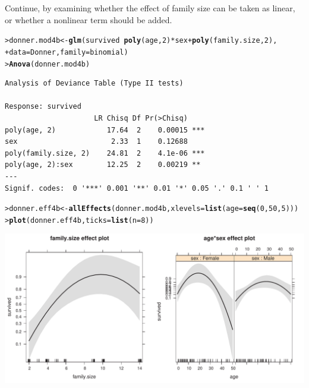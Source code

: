 \documentclass[10pt]{report}\usepackage[]{graphicx}\usepackage[]{color}
\makeatletter
\newcommand{\hlnum}[1]{\textcolor[rgb]{0.686,0.059,0.569}{#1}}%
\newcommand{\hlopt}[1]{\textcolor[rgb]{0,0,0}{#1}}%
\newcommand{\hlstd}[1]{\textcolor[rgb]{0.345,0.345,0.345}{#1}}%
\newcommand{\hlkwb}[1]{\textcolor[rgb]{0.69,0.353,0.396}{#1}}%
\newcommand{\hlkwc}[1]{\textcolor[rgb]{0.333,0.667,0.333}{#1}}%
\newcommand{\hlkwd}[1]{\textcolor[rgb]{0.737,0.353,0.396}{\textbf{#1}}}%
\newenvironment{kframe}{%
 \def\at@end@of@kframe{}%
 \ifinner\ifhmode%
  \def\at@end@of@kframe{\end{minipage}}%
  \begin{minipage}{\columnwidth}%
 \fi\fi%
 \def\FrameCommand##1{\hskip\@totalleftmargin \hskip-\fboxsep
 \colorbox{shadecolor}{##1}\hskip-\fboxsep
     \hskip-\linewidth \hskip-\@totalleftmargin \hskip\columnwidth}%
 \MakeFramed {\advance\hsize-\width
   \@totalleftmargin\z@ \linewidth\hsize
   \@setminipage}}%
 {\par\unskip\endMakeFramed%
 \at@end@of@kframe}
\newenvironment{knitrout}{}{} %
\renewenvironment{knitrout}{\small\renewcommand{\baselinestretch}{.85}}{} %
\makeatother
\begin{document}
\begin{Exercises}
\begin{enumerate*}
    \item Continue, by examining whether the effect of family size
    can be taken as linear, or whether a nonlinear term should be
    added.
    \begin{ans}
\begin{knitrout}\footnotesize
{}\color{fgcolor}\begin{kframe}
\begin{alltt}
\hlstd{> }\hlstd{donner.mod4b} \hlkwb{<-} \hlkwd{glm}\hlstd{(survived} \hlopt{~} \hlkwd{poly}\hlstd{(age,}\hlnum{2}\hlstd{)} \hlopt{*} \hlstd{sex} \hlopt{+} \hlkwd{poly}\hlstd{(family.size,} \hlnum{2}\hlstd{),}
\hlstd{+ }                    \hlkwc{data}\hlstd{=Donner,} \hlkwc{family}\hlstd{=binomial)}
\hlstd{> }\hlkwd{Anova}\hlstd{(donner.mod4b)}
\end{alltt}
\begin{verbatim}
Analysis of Deviance Table (Type II tests)

Response: survived
                     LR Chisq Df Pr(>Chisq)    
poly(age, 2)            17.64  2    0.00015 ***
sex                      2.33  1    0.12688    
poly(family.size, 2)    24.81  2    4.1e-06 ***
poly(age, 2):sex        12.25  2    0.00219 ** 
---
Signif. codes:  0 '***' 0.001 '**' 0.01 '*' 0.05 '.' 0.1 ' ' 1
\end{verbatim}
\begin{alltt}
\hlstd{> }\hlstd{donner.eff4b} \hlkwb{<-} \hlkwd{allEffects}\hlstd{(donner.mod4b,} \hlkwc{xlevels}\hlstd{=}\hlkwd{list}\hlstd{(}\hlkwc{age}\hlstd{=}\hlkwd{seq}\hlstd{(}\hlnum{0}\hlstd{,}\hlnum{50}\hlstd{,}\hlnum{5}\hlstd{)))}
\hlstd{> }\hlkwd{plot}\hlstd{(donner.eff4b,} \hlkwc{ticks}\hlstd{=}\hlkwd{list}\hlstd{(}\hlkwc{n}\hlstd{=}\hlnum{8}\hlstd{))}
\end{alltt}
\end{kframe}

\centerline{\includegraphics[width=.75\textwidth]{soln/fig/ex7_2c-1} }




\end{knitrout}
\end{ans}
\end{enumerate*}
\end{Exercises}
\end{document}
